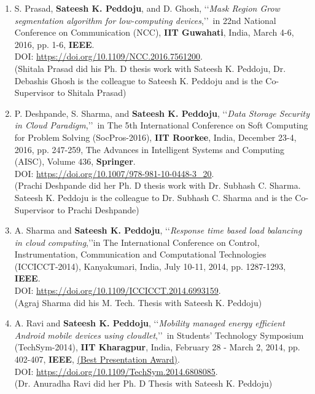 \begin{enumerate}
	
	\item
	S. Prasad, \textbf{Sateesh K. Peddoju}, and D. Ghosh, \lq\lq \textit{Mask Region Grow segmentation algorithm for low-computing devices},\rq\rq\, in 22nd National Conference on Communication (NCC), \textbf{IIT Guwahati}, India, March 4-6, 2016, pp. 1-6, \textbf{IEEE}. \\DOI: \url{https://doi.org/10.1109/NCC.2016.7561200}. \\(Shitala Prasad did his Ph. D thesis work with Sateesh K. Peddoju, Dr. Debashis Ghosh is the colleague to Sateesh K. Peddoju and is the Co-Supervisor to Shitala Prasad)

	
	\item
	P. Deshpande, S. Sharma, and \textbf{Sateesh K. Peddoju}, \lq\lq \textit{Data Storage Security in Cloud Paradigm},\rq\rq\, in The 5th International Conference on Soft Computing for Problem Solving (SocPros-2016), \textbf{IIT Roorkee}, India, December 23-4, 2016, pp. 247-259, The Advances in Intelligent Systems and Computing (AISC), Volume 436,  \textbf{Springer}. \\DOI:
\url{https://doi.org/10.1007/978-981-10-0448-3_20}. \\(Prachi Deshpande did her Ph. D thesis work with Dr. Subhash C. Sharma. Sateesh K. Peddoju is the colleague to Dr. Subhash C. Sharma and is the Co-Supervisor to Prachi Deshpande)

	
	\item
	A. Sharma and \textbf{Sateesh K. Peddoju}, \lq\lq \textit{Response time based load balancing in cloud computing},\rq\rq in The International Conference on Control, Instrumentation, Communication and Computational Technologies (ICCICCT-2014), Kanyakumari, India, July 10-11, 2014, pp. 1287-1293, \textbf{IEEE}. \\DOI: \url{https://doi.org/10.1109/ICCICCT.2014.6993159}. \\(Agraj Sharma did his M. Tech. Thesis with Sateesh K. Peddoju)

	
	\item
	A. Ravi and \textbf{Sateesh K. Peddoju}, \lq\lq \textit{Mobility managed energy efficient Android mobile devices using cloudlet},\rq\rq\, in Students' Technology Symposium (TechSym-2014), \textbf{IIT Kharagpur}, India, February 28 - March 2, 2014, pp. 402-407,  \textbf{IEEE}, \underline{(Best Presentation Award)}. \\DOI: \url{https://doi.org/10.1109/TechSym.2014.6808085}. \\(Dr. Anuradha Ravi did her Ph. D Thesis with Sateesh K. Peddoju)


\end{enumerate}
